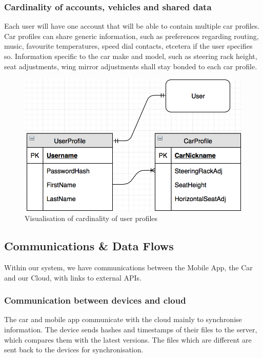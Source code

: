 \documentclass{article}
\begin{document}
\subsubsection{Cardinality of accounts, vehicles and shared data}
Each user will have one account that will be able to contain multiple car profiles. Car profiles can share generic information, such as preferences regarding routing, music, favourite temperatures, speed dial contacts, etcetera if the user specifies so. Information specific to the car make and model, such as steering rack height, seat adjustments, wing mirror adjustments shall stay bonded to each car profile.
\begin{figure}[H]
  \centering
  \includegraphics[scale=0.7]{profile-cardinality}
  \caption{Visualisation of cardinality of user profiles}\label{cardinality}
\end{figure}


\subsection{Communications \& Data Flows}\label{ssec:communications-data} %
Within our system, we have communications between the Mobile App, the Car and our Cloud, with links to external APIs.

\subsubsection{Communication between devices and cloud}\label{sssec:car-cloud}
The car and mobile app communicate with the cloud mainly to synchronise information. The device sends hashes and timestamps of their files to the server, which compares them with the latest versions. The files which are different are sent back to the devices for synchronisation.
\end{document}
